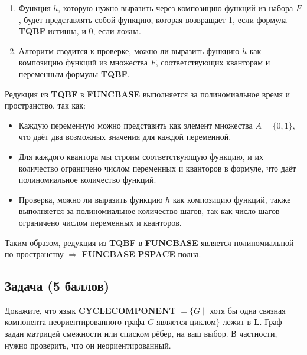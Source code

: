 \begin{solution}
\begin{enumerate}
        \item Функция $h$, которую нужно выразить через композицию функций из набора $F$, будет представлять собой функцию, которая возвращает 1, если формула \textbf{TQBF} истинна, и 0, если ложна.

        \item Алгоритм сводится к проверке, можно ли выразить функцию $h$ как композицию функций из множества $F$, соответствующих кванторам и переменным формулы \textbf{TQBF}.
    \end{enumerate}

    Редукция из \textbf{TQBF} в \textbf{FUNCBASE} выполняется за полиномиальное время и пространство, так как:
    \begin{itemize}
        \item Каждую переменную можно представить как элемент множества $A = \{0, 1\}$, что даёт два возможных значения для каждой переменной.
        \item Для каждого квантора мы строим соответствующую функцию, и их количество ограничено числом переменных и кванторов в формуле, что даёт полиномиальное количество функций.
        \item Проверка, можно ли выразить функцию $h$ как композицию функций, также выполняется за полиномиальное количество шагов, так как число шагов ограничено числом переменных и кванторов.
    \end{itemize}

    Таким образом, редукция из \textbf{TQBF} в \textbf{FUNCBASE} является полиномиальной по пространству $\Rightarrow$ \textbf{FUNCBASE} \textbf{PSPACE}-полна.
\end{solution}


\subsection{Задача \textbf{(5 баллов)}}

Докажите, что язык \textbf{CYCLECOMPONENT} $= \{G \mid$ хотя бы одна связная компонента неориентированного графа $G$
является циклом$\}$ лежит в \textbf{L}. Граф задан матрицей смежности или списком рёбер, на ваш выбор.
В частности, нужно проверить, что он неориентированный.

